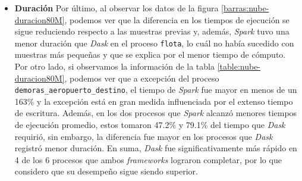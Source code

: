 \begin{itemize}
	\item \textbf{Duración} Por último, al observar los datos de la figura \ref{barras:nube-duracion80M}, podemos ver que la diferencia en los tiempos de ejecución se sigue reduciendo respecto a las muestras previas y, además, \textit{Spark} tuvo una menor duración que \textit{Dask} en el proceso \texttt{flota}, lo cuál no había sucedido con muestras más pequeñas y que se explica por el menor tiempo de cómputo. Por otro lado, si observamos la información de la tabla \ref{table:nube-duracion80M}, podemos ver que a excepción del proceso \texttt{demoras\_aeropuerto\_destino}, el tiempo de \textit{Spark} fue mayor en menos de un 163\% y la excepción está en gran medida influenciada por el extenso tiempo de escritura. Además, en los dos procesos que \textit{Spark} alcanzó menores tiempos de ejecución promedio, estos tomaron 47.2\% y 79.1\% del tiempo que \textit{Dask} requirió, sin embargo, la diferencia fue mayor en los procesos que \textit{Dask} registró menor duración. En suma, \textit{Dask} fue significativamente más rápido en 4 de los 6 procesos que ambos \textit{frameworks} lograron completar, por lo que considero que su desempeño sigue siendo superior.
	
\end{itemize}

